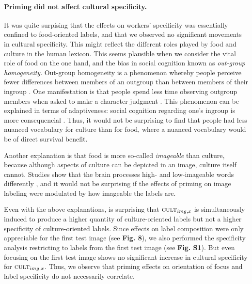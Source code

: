 \documentclass[a4paper]{report}
\begin{document}
\paragraph{Priming did not affect cultural specificity.}
It was quite surpising that the effects on workers' specificity was essentially
confined to food-oriented labels, and that we observed no significant movements
in cultural specificity.   This might reflect the different roles
played by food and culture in the human lexicon.  This seems plausible when we 
consider the vital role of food on the one hand, and the bias in social 
cognition known as \textit{out-group homogeneity}\cite{Vala2012491,Ray2012387,Ishii2011159,Boldry2007157}.
Out-group homogeneity is a phenomenon whereby people perceive fewer 
differences between members of an outgroup than between members of their 
ingroup \cite{Boldry2007157}.  One manifestation is that people 
spend less time observing outgroup members when asked to make a character 
judgment \cite{Vala2012491}.  This phenomenon can be explained in terms of 
adaptiveness: social cognition regarding one's ingroup is more consequencial
\cite{Vala2012491}.  Thus, it would not be surprising to find that people had 
less nuanced vocabulary for culture than for food, where a nuanced vocabulary 
would be of direct survival benefit.

Another explanation is that food is more so-called \textit{imageable} than 
culture, because although aspects of culture can be depicted in an image,
culture itself cannot.  Studies show that the brain processes high- and 
low-imageable words differently \cite{Swaab200299}, and it would not be 
surprising if the effects of priming on image labeling were modulated by how 
imageable the labels are.

Even with the above explanations, is surprising that 
$\textsc{cult}_{img,x}$ is simultaneously induced to 
produce a higher quantity of culture-oriented labels but not a higher
specificity of culture-oriented labels.  Since effects on 
label composition were only appreciable for the first test image 
(see \textbf{Fig. 8}), we also
performed the specificity analysis restricting to labels from the first
test image (see \textbf{Fig. S1}).  But even focusing on the first test image
shows no significant increase in cultural specificity for 
$\textsc{cult}_{img,x}$.  Thus, we observe that priming effects on 
orientation of focus and label specificity do not necessarily correlate.
\end{document}
